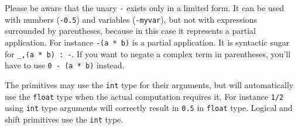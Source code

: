 Please be aware that the unary \lstinline|-| exists only in a limited form. It can be used with numbers (\lstinline|-0.5|) and variables (\lstinline|-myvar|), but not with expressions surrounded by parentheses, because in this case it represents a partial application.  For instance \lstinline|-(a * b)| is a partial application. It is syntactic sugar for \lstinline|_,(a * b) : -|. If you want to negate a complex term in parentheses, you'll have to use \lstinline|0 - (a * b)| instead.

The primitives may use the \texttt{int} type for their arguments, but will automatically use the \texttt{float} type when the actual computation requires it. For instance \lstinline|1/2| using \texttt{int} type arguments will correctly result in \lstinline|0.5| in \texttt{float} type. Logical and shift primitives use the \texttt{int} type.

\bigskip

